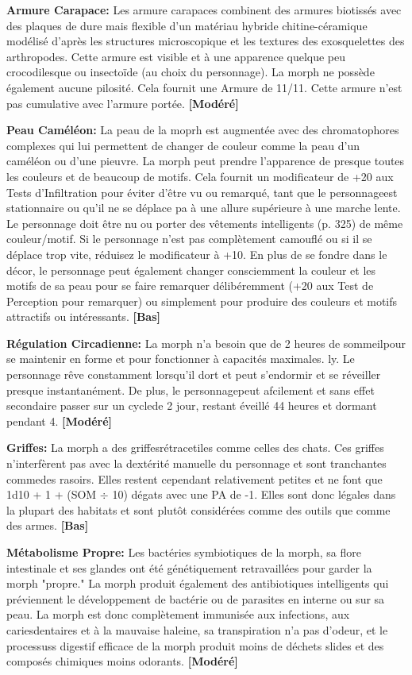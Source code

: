 {{\textbf{Armure Carapace:} Les armure carapaces combinent des armures biotissés avec des plaques de dure mais flexible d'un matériau hybride chitine-céramique modélisé d'après les structures microscopique et les textures des exosquelettes des arthropodes. Cette armure est visible et à une apparence quelque peu crocodilesque ou insectoïde (au choix du personnage). La morph ne possède également aucune pilosité. Cela fournit une Armure de 11/11. Cette armure n'est pas cumulative avec l'armure portée. \textbf{[Modéré]} 

\textbf{Peau Caméléon:} La peau de la moprh est augmentée avec des chromatophores complexes qui lui permettent de changer de couleur comme la peau d'un caméléon ou d'une pieuvre. La morph peut prendre l'apparence de presque toutes les couleurs et de beaucoup de motifs. Cela fournit un modificateur de +20 aux Tests d'Infiltration pour éviter d'être vu ou remarqué, tant que le personnageest stationnaire ou qu'il ne se déplace pa à une allure supérieure à une marche lente. Le personnage doit être nu ou porter des vêtements intelligents (p. 325) de même couleur/motif. Si le personnage n'est pas complètement camouflé ou si il se déplace trop vite, réduisez le modificateur à +10. En plus de se fondre dans le décor, le personnage peut également changer consciemment la couleur et les motifs de sa peau pour se faire remarquer délibéremment (+20 aux Test de Perception pour remarquer) ou simplement pour produire des couleurs et motifs attractifs ou intéressants. \textbf{[Bas]} 

\textbf{Régulation Circadienne:} La morph n'a besoin que de 2 heures de sommeilpour se maintenir en forme et pour fonctionner à capacités maximales. ly.
Le personnage rêve constamment lorsqu'il dort et peut s'endormir et se réveiller presque instantanément. De plus, le personnagepeut afcilement et sans effet secondaire passer sur un cyclede 2 jour, restant éveillé 44 heures et dormant pendant 4. \textbf{[Modéré]} 

\textbf{Griffes:} La morph a des griffesrétracetiles comme celles des chats. Ces griffes n'interfèrent pas avec la dextérité manuelle du personnage et sont tranchantes commedes rasoirs. Elles restent cependant relativement petites et ne font que 1d10 + 1 + (SOM $\div$ 10) dégats avec une PA de -1. Elles sont donc légales dans la plupart des habitats et sont plutôt considérées comme des outils que comme des armes. \textbf{[Bas]} 

\textbf{Métabolisme Propre:} Les bactéries symbiotiques de la morph, sa flore intestinale et ses glandes ont été génétiquement retravaillées pour garder la morph "propre." La morph produit également des antibiotiques intelligents qui préviennent le développement de bactérie ou de parasites en interne ou sur sa peau. La morph est donc complètement immunisée aux infections, aux cariesdentaires et à la mauvaise haleine, sa transpiration n'a pas d'odeur, et le processuss digestif efficace de la morph produit moins de déchets slides et des composés chimiques moins odorants. \textbf{[Modéré]} 

}}
